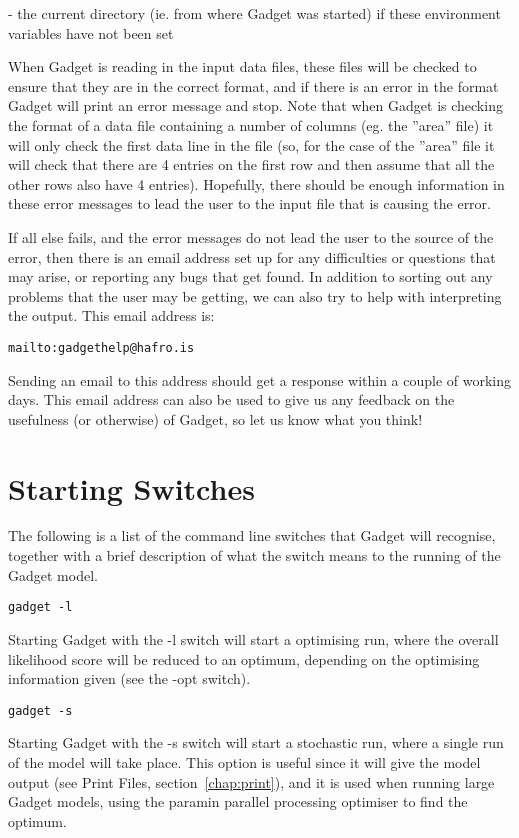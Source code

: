 \documentclass [a4paper, 10pt]{book}
\begin{document}
 - the current directory (ie. from where Gadget was started) if these environment variables have not been set

\bigskip
When Gadget is reading in the input data files, these files will be checked to ensure that they are in the correct format, and if there is an error in the format Gadget will print an error message and stop.  Note that when Gadget is checking the format of a data file containing a number of columns (eg. the ''area'' file) it will only check the first data line in the file (so, for the case of the ''area'' file it will check that there are 4 entries on the first row and then assume that all the other rows also have 4 entries).  Hopefully, there should be enough information in these error messages to lead the user to the input file that is causing the error.

\bigskip
If all else fails, and the error messages do not lead the user to the source of the error, then there is an email address set up for any difficulties or questions that may arise, or reporting any bugs that get found.  In addition to sorting out any problems that the user may be getting, we can also try to help with interpreting the output.  This email address is:

{\small\begin{verbatim}
mailto:gadgethelp@hafro.is
\end{verbatim}}

Sending an email to this address should get a response within a couple of working days.  This email address can also be used to give us any feedback on the usefulness (or otherwise) of Gadget, so let us know what you think!

\section{Starting Switches}\label{sec:starting}
The following is a list of the command line switches that Gadget will recognise, together with a brief description of what the switch means to the running of the Gadget model.

{\small\begin{verbatim}
gadget -l
\end{verbatim}}
Starting Gadget with the -l switch will start a optimising run, where the overall likelihood score will be reduced to an optimum, depending on the optimising information given (see the -opt switch).

{\small\begin{verbatim}
gadget -s
\end{verbatim}}
Starting Gadget with the -s switch will start a stochastic run, where a single run of the model will take place.  This option is useful since it will give the model output (see Print Files, section~\ref{chap:print}), and it is used when running large Gadget models, using the paramin parallel processing optimiser to find the optimum.
\end{document}
